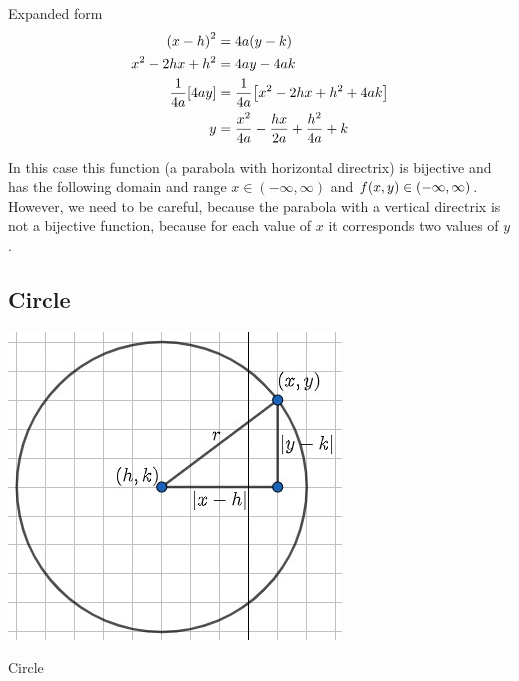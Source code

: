 \documentclass[../main-notes.tex]{subfile}
\begin{document}
\begin{note}{Expanded form}{~}
 \begin{align*}
    \qty(x-h)^2 &= 4a\qty(y-k) \\
    x^2 -2hx +h^2 &= 4ay-4ak \\
    \frac{1}{4a}\qty[4ay] &=\frac{1}{4a}\qty[x^2 -2hx + h^2 +4ak] \\
    y &=\frac{x^2}{4a} -\frac{hx}{2a} +\frac{h^2}{4a}  +k 
\end{align*}

In this case this function (a parabola with horizontal directrix) is bijective and has the following domain and range $x\in(-\infty,\infty)$ and $f(x,y)\in\qty(-\infty,\infty)$.
However, we need to be careful, because the parabola with a vertical directrix is not a bijective function, because for each value of $x$ it corresponds two values of $y$.
   
\end{note}



\subsection{Circle}

\begin{marginfigure}
    \centering
    \includegraphics[width=\textwidth]{../Figures/circunference/circle-translate.jpg}
    \caption{Circle}\label{fig-circle-recap}
\end{marginfigure}
\end{document}
